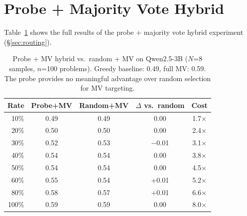 \documentclass[11pt]{article}
\newcommand{\modelsmall}{Qwen2.5-3B}
\begin{document}
\section{Probe + Majority Vote Hybrid}
\label{app:hybrid}

Table~\ref{tab:hybrid} shows the full results of the probe + majority vote hybrid experiment (\S\ref{sec:routing}).

\begin{table}[h]
\centering
\small
\begin{tabular}{rcccc}
\toprule
\textbf{Rate} & \textbf{Probe+MV} & \textbf{Random+MV} & \textbf{$\Delta$ vs.\ random} & \textbf{Cost} \\
\midrule
10\% & 0.49 & 0.49 & 0.00 & 1.7$\times$ \\
20\% & 0.50 & 0.50 & 0.00 & 2.4$\times$ \\
30\% & 0.52 & 0.53 & $-$0.01 & 3.1$\times$ \\
40\% & 0.54 & 0.54 & 0.00 & 3.8$\times$ \\
50\% & 0.54 & 0.54 & 0.00 & 4.5$\times$ \\
60\% & 0.55 & 0.54 & +0.01 & 5.2$\times$ \\
80\% & 0.58 & 0.57 & +0.01 & 6.6$\times$ \\
100\% & 0.59 & 0.59 & 0.00 & 8.0$\times$ \\
\bottomrule
\end{tabular}
\caption{Probe + MV hybrid vs.\ random + MV on \modelsmall{} ($N$=8 samples, $n$=100 problems). Greedy baseline: 0.49, full MV: 0.59. The probe provides no meaningful advantage over random selection for MV targeting.}
\label{tab:hybrid}
\end{table}
\end{document}
